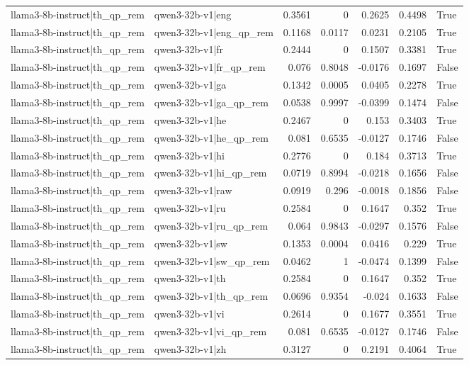 \begin{table}
\begin{tabular}{l l r r r r l}
llama3-8b-instruct|th_qp_rem & qwen3-32b-v1|eng & 0.3561 & 0 & 0.2625 & 0.4498 & True \\
llama3-8b-instruct|th_qp_rem & qwen3-32b-v1|eng_qp_rem & 0.1168 & 0.0117 & 0.0231 & 0.2105 & True \\
llama3-8b-instruct|th_qp_rem & qwen3-32b-v1|fr & 0.2444 & 0 & 0.1507 & 0.3381 & True \\
llama3-8b-instruct|th_qp_rem & qwen3-32b-v1|fr_qp_rem & 0.076 & 0.8048 & -0.0176 & 0.1697 & False \\
llama3-8b-instruct|th_qp_rem & qwen3-32b-v1|ga & 0.1342 & 0.0005 & 0.0405 & 0.2278 & True \\
llama3-8b-instruct|th_qp_rem & qwen3-32b-v1|ga_qp_rem & 0.0538 & 0.9997 & -0.0399 & 0.1474 & False \\
llama3-8b-instruct|th_qp_rem & qwen3-32b-v1|he & 0.2467 & 0 & 0.153 & 0.3403 & True \\
llama3-8b-instruct|th_qp_rem & qwen3-32b-v1|he_qp_rem & 0.081 & 0.6535 & -0.0127 & 0.1746 & False \\
llama3-8b-instruct|th_qp_rem & qwen3-32b-v1|hi & 0.2776 & 0 & 0.184 & 0.3713 & True \\
llama3-8b-instruct|th_qp_rem & qwen3-32b-v1|hi_qp_rem & 0.0719 & 0.8994 & -0.0218 & 0.1656 & False \\
llama3-8b-instruct|th_qp_rem & qwen3-32b-v1|raw & 0.0919 & 0.296 & -0.0018 & 0.1856 & False \\
llama3-8b-instruct|th_qp_rem & qwen3-32b-v1|ru & 0.2584 & 0 & 0.1647 & 0.352 & True \\
llama3-8b-instruct|th_qp_rem & qwen3-32b-v1|ru_qp_rem & 0.064 & 0.9843 & -0.0297 & 0.1576 & False \\
llama3-8b-instruct|th_qp_rem & qwen3-32b-v1|sw & 0.1353 & 0.0004 & 0.0416 & 0.229 & True \\
llama3-8b-instruct|th_qp_rem & qwen3-32b-v1|sw_qp_rem & 0.0462 & 1 & -0.0474 & 0.1399 & False \\
llama3-8b-instruct|th_qp_rem & qwen3-32b-v1|th & 0.2584 & 0 & 0.1647 & 0.352 & True \\
llama3-8b-instruct|th_qp_rem & qwen3-32b-v1|th_qp_rem & 0.0696 & 0.9354 & -0.024 & 0.1633 & False \\
llama3-8b-instruct|th_qp_rem & qwen3-32b-v1|vi & 0.2614 & 0 & 0.1677 & 0.3551 & True \\
llama3-8b-instruct|th_qp_rem & qwen3-32b-v1|vi_qp_rem & 0.081 & 0.6535 & -0.0127 & 0.1746 & False \\
llama3-8b-instruct|th_qp_rem & qwen3-32b-v1|zh & 0.3127 & 0 & 0.2191 & 0.4064 & True \\

\end{tabular}
\end{table}
